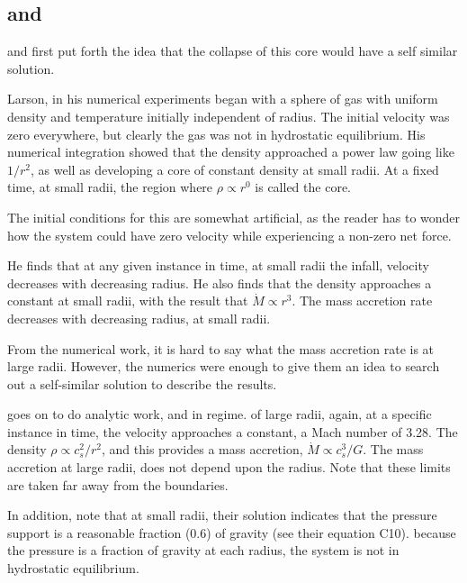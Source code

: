 \documentclass[../dissertation.tex]{subfiles}
\begin{document}
\subsection{\citet{1969MNRAS.145..271L} and \citet{1969MNRAS.144..425P}}
\citet{1969MNRAS.145..271L} and \citet{1969MNRAS.144..425P} first put forth the idea that the collapse of this core would have a self similar solution. 

Larson, in his numerical experiments began with a sphere of gas with  uniform density and temperature initially independent of radius. 
The initial velocity was zero everywhere, but clearly the gas was not in hydrostatic equilibrium. His numerical integration showed that the density approached a power law going like $1/r^2$, as well as developing a core of constant density at small radii. At a fixed time, at small radii, the region where $\rho \propto r^0$ is called the core. 

The initial conditions for this are somewhat artificial, as the reader has to wonder how the system could have zero velocity while experiencing a non-zero net force.



He finds that at any given instance in time, at small radii the infall, velocity decreases with decreasing radius.
He also finds that the density approaches a constant at small radii, with the result that $\dot{M} \propto r^3 $. 
The mass accretion rate decreases with decreasing radius, at small radii.

From the numerical work, it is hard to say what the mass accretion rate is at large radii. 
However, the numerics were enough to give them an idea to search out a self-similar solution to describe the results.

\citet{1969MNRAS.145..271L} goes on to do analytic work, and in regime. 
of large radii, again, at a specific instance in time, the velocity approaches a constant, a Mach number of 3.28. 
The density $\rho \propto c_s^2 / r^2$, and this provides a mass accretion, $\dot{M} \propto c_s^3 / G$. 
The mass accretion at large radii, does not depend upon the radius. 
Note that these limits are taken far away from the boundaries.

In addition, \citet{1969MNRAS.145..271L} note that at small radii, their solution indicates that the pressure support is a reasonable fraction (0.6) of gravity (see their equation C10). 
because the  pressure is a fraction of gravity at each radius, the system is not in hydrostatic equilibrium.
\end{document}
